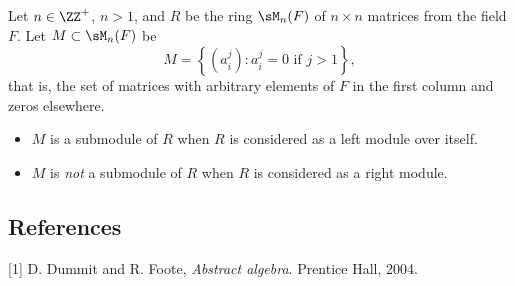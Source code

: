 \documentclass[11pt]{amsart}
\providecommand{\tightlist}{%
  \setlength{\itemsep}{0pt}\setlength{\parskip}{0pt}}
\begin{document}
\gvn Let \(n \in \ZZ^+\), \(n >1\), and \(R\) be the ring \(\sM_n(F)\)
of \(n \times n\) matrices from the field \(F\). Let
\(M\subset \sM_n(F)\) be
\[M = \left\{(a_i^j) : a_i^j = 0 \text{ if } j > 1\right\},\] that is,
the set of matrices with arbitrary elements of \(F\) in the first column
and zeros elsewhere.

\wts

\begin{itemize}
\tightlist
\item
  \(M\) is a submodule of \(R\) when \(R\) is considered as a left
  module over itself.
\item
  \(M\) is \emph{not} a submodule of \(R\) when \(R\) is considered as a
  right module.
\end{itemize}

\subsection*{References}

\hypertarget{refs}{}
\leavevmode\hypertarget{ref-DF04}{}%
{[}1{]} D. Dummit and R. Foote, \emph{Abstract algebra}. Prentice Hall,
2004.
\end{document}
